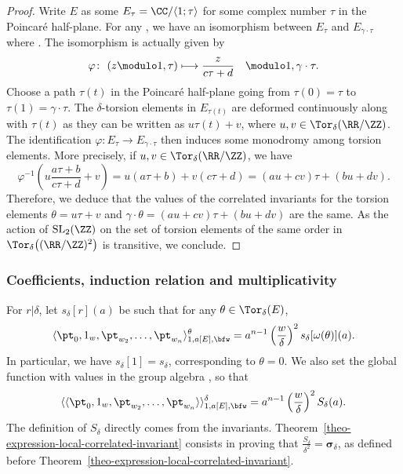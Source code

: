 \begin{proof}
 Write $E$ as some $E_\tau=\CC/\langle1;\tau\rangle$ for some complex number $\tau$ in the Poincar\'e half-plane. For any , we have an isomorphism between $E_\tau$ and $E_{\gamma\cdot\tau}$ where . The isomorphism is actually given by
 \[ \varphi\colon\ (z \modulo 1,\tau) \longmapsto \frac{z}{c\tau+d} \quad \modulo 1,\gamma\cdot\tau. \]
 Choose a path $\tau(t)$ in the Poincar\'e half-plane going from $\tau(0)=\tau$ to $\tau(1)=\gamma\cdot\tau$. The $\delta$-torsion elements in $E_{\tau(t)}$ are deformed continuously along with $\tau(t)$ as they can be written as $u\tau(t)+v$, where $u,v\in\Tor_\delta(\RR/\ZZ)$. The identification $\varphi\colon E_\tau\to E_{\gamma\cdot\tau}$ then induces some monodromy among torsion elements. More precisely, if $u,v\in \Tor_\delta(\RR/\ZZ)$, we have
 \[ \varphi^{-1}\left(u\frac{a\tau+b}{c\tau+d}+v \right)=u(a\tau+b)+v(c\tau+d) = (au+cv)\tau+(bu+dv). \]
 Therefore, we deduce that the values of the correlated invariants for the torsion elements $\theta=u\tau+v$ and $\gamma\cdot\theta=(au+cv)\tau+(bu+dv)$ are the same. As the action of ${\rm SL}_2(\ZZ)$ on the set of torsion elements of the same order in $\Tor_\delta\bigl((\RR/\ZZ)^2\bigr)$ is transitive, we conclude.
\end{proof}

\subsubsection{Coefficients, induction relation and multiplicativity} For $r|\delta$, let $s_\delta[r](a)$ be such that for any $\theta\in\Tor_\delta(E)$,
\[ \langle\pt_0,1_w,\pt_{w_2},\dots,\pt_{w_n}\rangle_{1,a[E],\bfw}^\theta = a^{n-1}\left(\frac{w}{\delta}\right)^2 s_\delta[\omega(\theta)](a). \]
In particular, we have $s_\delta[1]=s_\delta$, corresponding to $\theta=0$. We also set the global function with values in the group algebra , so that
\[ \langle\langle\pt_0,1_w,\pt_{w_2},\dots,\pt_{w_n}\rangle\rangle^\delta_{1,a[E],\bfw} = a^{n-1}\left(\frac{w}{\delta}\right)^2 S_\delta(a). \]
The definition of $S_\delta$ directly comes from the invariants. Theorem~\ref{theo-expression-local-correlated-invariant} consists in proving that $\frac{S_\delta}{\delta^2}=\boldsymbol{\sigma}_\delta$, as defined before Theorem~\ref{theo-expression-local-correlated-invariant}.

